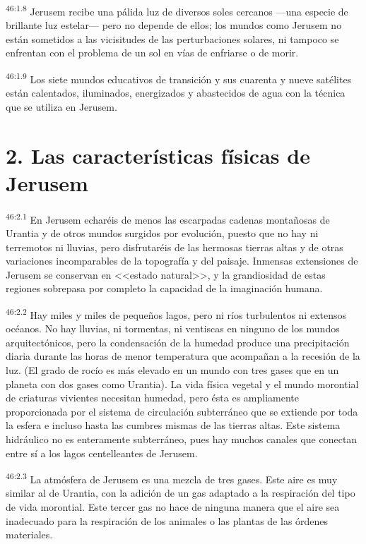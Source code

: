 \par
\textsuperscript{46:1.8} Jerusem recibe una pálida luz de diversos soles cercanos ---una especie de brillante luz estelar--- pero no depende de ellos; los mundos como Jerusem no están sometidos a las vicisitudes de las perturbaciones solares, ni tampoco se enfrentan con el problema de un sol en vías de enfriarse o de morir.

\par
\textsuperscript{46:1.9} Los siete mundos educativos de transición y sus cuarenta y nueve satélites están calentados, iluminados, energizados y abastecidos de agua con la técnica que se utiliza en Jerusem.

\section*{2. Las características físicas de Jerusem}
\par
\textsuperscript{46:2.1} En Jerusem echaréis de menos las escarpadas cadenas montañosas de Urantia y de otros mundos surgidos por evolución, puesto que no hay ni terremotos ni lluvias, pero disfrutaréis de las hermosas tierras altas y de otras variaciones incomparables de la topografía y del paisaje. Inmensas extensiones de Jerusem se conservan en <<estado natural>>, y la grandiosidad de estas regiones sobrepasa por completo la capacidad de la imaginación humana.

\par
\textsuperscript{46:2.2} Hay miles y miles de pequeños lagos, pero ni ríos turbulentos ni extensos océanos. No hay lluvias, ni tormentas, ni ventiscas en ninguno de los mundos arquitectónicos, pero la condensación de la humedad produce una precipitación diaria durante las horas de menor temperatura que acompañan a la recesión de la luz. (El grado de rocío es más elevado en un mundo con tres gases que en un planeta con dos gases como Urantia). La vida física vegetal y el mundo morontial de criaturas vivientes necesitan humedad, pero ésta es ampliamente proporcionada por el sistema de circulación subterráneo que se extiende por toda la esfera e incluso hasta las cumbres mismas de las tierras altas. Este sistema hidráulico no es enteramente subterráneo, pues hay muchos canales que conectan entre sí a los lagos centelleantes de Jerusem.

\par
\textsuperscript{46:2.3} La atmósfera de Jerusem es una mezcla de tres gases. Este aire es muy similar al de Urantia, con la adición de un gas adaptado a la respiración del tipo de vida morontial. Este tercer gas no hace de ninguna manera que el aire sea inadecuado para la respiración de los animales o las plantas de las órdenes materiales.

